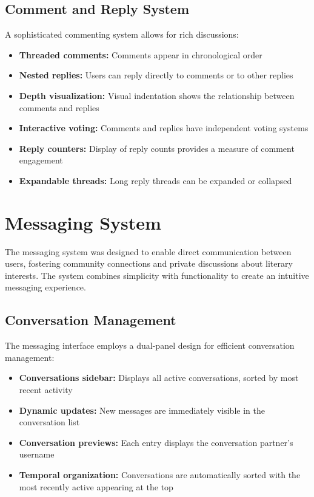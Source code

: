 \documentclass{article}
\begin{document}
\subsection{Comment and Reply System}
A sophisticated commenting system allows for rich discussions:
\begin{itemize}
    \item \textbf{Threaded comments:} Comments appear in chronological order
    \item \textbf{Nested replies:} Users can reply directly to comments or to other replies
    \item \textbf{Depth visualization:} Visual indentation shows the relationship between comments and replies
    \item \textbf{Interactive voting:} Comments and replies have independent voting systems
    \item \textbf{Reply counters:} Display of reply counts provides a measure of comment engagement
    \item \textbf{Expandable threads:} Long reply threads can be expanded or collapsed
\end{itemize}

\section{Messaging System}
The messaging system was designed to enable direct communication between users, fostering community connections and private discussions about literary interests. The system combines simplicity with functionality to create an intuitive messaging experience.

\subsection{Conversation Management}
The messaging interface employs a dual-panel design for efficient conversation management:
\begin{itemize}
    \item \textbf{Conversations sidebar:} Displays all active conversations, sorted by most recent activity
    \item \textbf{Dynamic updates:} New messages are immediately visible in the conversation list
    \item \textbf{Conversation previews:} Each entry displays the conversation partner's username
    \item \textbf{Temporal organization:} Conversations are automatically sorted with the most recently active appearing at the top
\end{itemize}
\end{document}
